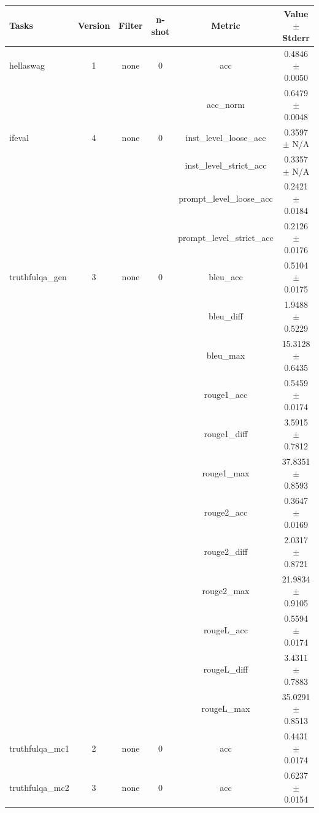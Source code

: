 \documentclass{ifacconf}
\begin{document}
\begin{strip}
\begin{minipage}{\textwidth}
    \begin{table}[H]
    \centering
    \begin{tabular}{|l|c|c|c|c|c|}
    \hline
    \textbf{Tasks} & \textbf{Version} & \textbf{Filter} & \textbf{n-shot} & \textbf{Metric} & \textbf{Value} $\pm$ \textbf{Stderr} \\ \hline
    hellaswag & 1 & none & 0 & acc & 0.4846 $\pm$ 0.0050 \\ \hline
    & & & & acc\_norm & 0.6479 $\pm$ 0.0048 \\ \hline
    ifeval & 4 & none & 0 & inst\_level\_loose\_acc & 0.3597 $\pm$ N/A \\ \hline
    & & & & inst\_level\_strict\_acc & 0.3357 $\pm$ N/A \\ \hline
    & & & & prompt\_level\_loose\_acc & 0.2421 $\pm$ 0.0184 \\ \hline
    & & & & prompt\_level\_strict\_acc & 0.2126 $\pm$ 0.0176 \\ \hline
    truthfulqa\_gen & 3 & none & 0 & bleu\_acc & 0.5104 $\pm$ 0.0175 \\ \hline
    & & & & bleu\_diff & 1.9488 $\pm$ 0.5229 \\ \hline
    & & & & bleu\_max & 15.3128 $\pm$ 0.6435 \\ \hline
    & & & & rouge1\_acc & 0.5459 $\pm$ 0.0174 \\ \hline
    & & & & rouge1\_diff & 3.5915 $\pm$ 0.7812 \\ \hline
    & & & & rouge1\_max & 37.8351 $\pm$ 0.8593 \\ \hline
    & & & & rouge2\_acc & 0.3647 $\pm$ 0.0169 \\ \hline
    & & & & rouge2\_diff & 2.0317 $\pm$ 0.8721 \\ \hline
    & & & & rouge2\_max & 21.9834 $\pm$ 0.9105 \\ \hline
    & & & & rougeL\_acc & 0.5594 $\pm$ 0.0174 \\ \hline
    & & & & rougeL\_diff & 3.4311 $\pm$ 0.7883 \\ \hline
    & & & & rougeL\_max & 35.0291 $\pm$ 0.8513 \\ \hline
    truthfulqa\_mc1 & 2 & none & 0 & acc & 0.4431 $\pm$ 0.0174 \\ \hline
    truthfulqa\_mc2 & 3 & none & 0 & acc & 0.6237 $\pm$ 0.0154 \\ \hline
    \end{tabular}
    \label{tab:gemma2_q4km}
    \end{table}


\end{minipage}
\end{strip}
\end{document}
